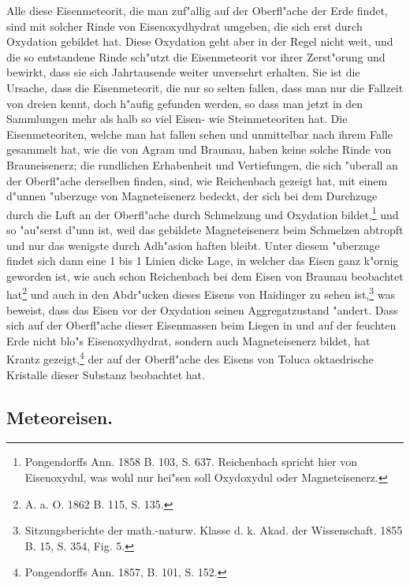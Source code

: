 \documentclass[a4paper, 11pt, oneside]{article}
\begin{document}
Alle diese Eisenmeteorit, die man zuf"allig auf der Oberfl"ache der Erde findet, sind mit solcher Rinde von Eisenoxydhydrat umgeben, die sich erst durch Oxydation gebildet hat. Diese Oxydation geht aber in der Regel nicht weit, und die so entstandene Rinde sch"utzt die Eisenmeteorit vor ihrer Zerst"orung und bewirkt, dass sie sich Jahrtausende weiter unversehrt erhalten. Sie ist die Ursache, dass die Eisenmeteorit, die nur so selten fallen, dass man nur die Fallzeit von dreien kennt, doch h"aufig gefunden werden, so dass man jetzt in den Sammlungen mehr als halb so viel Eisen- wie Steinmeteoriten hat. Die Eisenmeteoriten, welche man hat fallen sehen und unmittelbar nach ihrem Falle gesammelt hat, wie die von Agram und Braunau, haben keine solche Rinde von Brauneisenerz; die rundlichen Erhabenheit und Vertiefungen, die sich "uberall an der Oberfl"ache derselben finden, sind, wie Reichenbach gezeigt hat, mit einem d"unnen "uberzuge von Magneteisenerz bedeckt, der sich bei dem Durchzuge durch die Luft an der Oberfl"ache durch Schmelzung und Oxydation bildet,\footnote{Pongendorffs Ann. 1858 B. 103, S. 637. Reichenbach spricht hier von Eisenoxydul, was wohl nur hei"sen soll Oxydoxydul oder Magneteisenerz.} und so "au"serst d"unn ist, weil das gebildete Magneteisenerz beim Schmelzen abtropft und nur das wenigste durch Adh"asion haften bleibt. Unter diesem "uberzuge findet sich dann eine 1 bis 1 Linien dicke Lage, in welcher das Eisen ganz k"ornig geworden ist, wie auch schon Reichenbach bei dem Eisen von Braunau beobachtet hat\footnote{A. a. O. 1862 B. 115, S. 135.} und auch in den Abdr"ucken dieses Eisens von Haidinger zu sehen ist,\footnote{Sitzungsberichte der math.-naturw. Klasse d. k. Akad. der Wissenschaft. 1855 B. 15, S. 354, Fig. 5.} was beweist, dass das Eisen vor der Oxydation seinen Aggregatzustand "andert. Dass sich auf der Oberfl"ache dieser Eisenmassen beim Liegen in und auf der feuchten Erde nicht blo"s Eisenoxydhydrat, sondern auch Magneteisenerz bildet, hat Krantz gezeigt,\footnote{Pongendorffs Ann. 1857, B. 101, S. 152.} der auf der Oberfl"ache des Eisens von Toluca oktaedrische Kristalle dieser Substanz beobachtet hat.
\subsection{Meteoreisen.}
\end{document}
